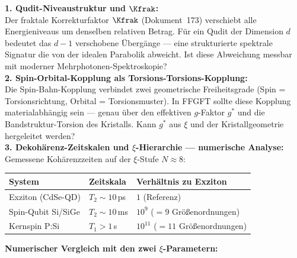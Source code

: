 \begin{significance}
\textbf{1. Qudit-Niveaustruktur und $\Kfrak$:}\\
Der fraktale Korrekturfaktor $\Kfrak$ (Dokument~173)
verschiebt alle Energieniveaus um denselben relativen Betrag.
Für ein Qudit der Dimension $d$ bedeutet das
$d-1$ verschobene Übergänge --- eine strukturierte
spektrale Signatur die von der idealen Parabolik abweicht.
Ist diese Abweichung messbar mit moderner
Mehrphotonen-Spektroskopie?\\[6pt]

\textbf{2. Spin-Orbital-Kopplung als Torsions-Torsions-Kopplung:}\\
Die Spin-Bahn-Kopplung verbindet zwei geometrische
Freiheitsgrade (Spin = Torsionsrichtung,
Orbital = Torsionsmuster). In FFGFT sollte diese
Kopplung materialabhängig sein --- genau über den
effektiven $g$-Faktor $g^*$ und die
Bandstruktur-Torsion des Kristalls.
Kann $g^*$ aus $\xi$ und der Kristallgeometrie
hergeleitet werden?\\[6pt]

\textbf{3. Dekohärenz-Zeitskalen und $\xi$-Hierarchie --- numerische Analyse:}\\
Gemessene Kohärenzzeiten auf der $\xi$-Stufe $N \approx 8$:
\begin{center}
{\footnotesize
\begin{tabular}{lll}
\toprule
System & Zeitskala & Verhältnis zu Exziton \\
\midrule
Exziton (CdSe-QD) & $T_2 \sim 10$\,ps & $1$ (Referenz) \\
Spin-Qubit Si/SiGe & $T_2 \sim 10$\,ms & $10^9$ ($= 9$ Größenordnungen) \\
Kernspin P:Si & $T_1 > 1$\,s & $10^{11}$ ($= 11$ Größenordnungen) \\
\bottomrule
\end{tabular}
} %
\end{center}

\textbf{Numerischer Vergleich mit den zwei $\xi$-Parametern:}
\begin{center}
{\footnotesize{}} %
\end{center}


\end{significance}
